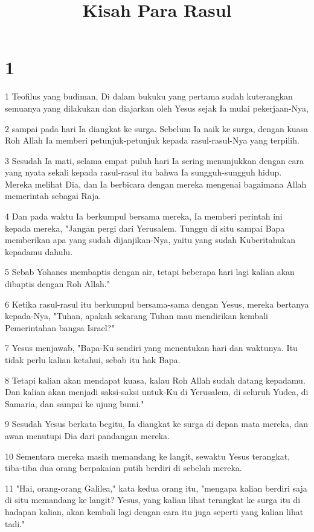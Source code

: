 

\title{Kisah Para Rasul}


\chapter{1}

\par 1 Teofilus yang budiman, Di dalam bukuku yang pertama sudah kuterangkan semuanya yang dilakukan dan diajarkan oleh Yesus sejak Ia mulai pekerjaan-Nya,
\par 2 sampai pada hari Ia diangkat ke surga. Sebelum Ia naik ke surga, dengan kuasa Roh Allah Ia memberi petunjuk-petunjuk kepada rasul-rasul-Nya yang terpilih.
\par 3 Sesudah Ia mati, selama empat puluh hari Ia sering menunjukkan dengan cara yang nyata sekali kepada rasul-rasul itu bahwa Ia sungguh-sungguh hidup. Mereka melihat Dia, dan Ia berbicara dengan mereka mengenai bagaimana Allah memerintah sebagai Raja.
\par 4 Dan pada waktu Ia berkumpul bersama mereka, Ia memberi perintah ini kepada mereka, "Jangan pergi dari Yerusalem. Tunggu di situ sampai Bapa memberikan apa yang sudah dijanjikan-Nya, yaitu yang sudah Kuberitahukan kepadamu dahulu.
\par 5 Sebab Yohanes membaptis dengan air, tetapi beberapa hari lagi kalian akan dibaptis dengan Roh Allah."
\par 6 Ketika rasul-rasul itu berkumpul bersama-sama dengan Yesus, mereka bertanya kepada-Nya, "Tuhan, apakah sekarang Tuhan mau mendirikan kembali Pemerintahan bangsa Israel?"
\par 7 Yesus menjawab, "Bapa-Ku sendiri yang menentukan hari dan waktunya. Itu tidak perlu kalian ketahui, sebab itu hak Bapa.
\par 8 Tetapi kalian akan mendapat kuasa, kalau Roh Allah sudah datang kepadamu. Dan kalian akan menjadi saksi-saksi untuk-Ku di Yerusalem, di seluruh Yudea, di Samaria, dan sampai ke ujung bumi."
\par 9 Sesudah Yesus berkata begitu, Ia diangkat ke surga di depan mata mereka, dan awan menutupi Dia dari pandangan mereka.
\par 10 Sementara mereka masih memandang ke langit, sewaktu Yesus terangkat, tiba-tiba dua orang berpakaian putih berdiri di sebelah mereka.
\par 11 "Hai, orang-orang Galilea," kata kedua orang itu, "mengapa kalian berdiri saja di situ memandang ke langit? Yesus, yang kalian lihat terangkat ke surga itu di hadapan kalian, akan kembali lagi dengan cara itu juga seperti yang kalian lihat tadi."
